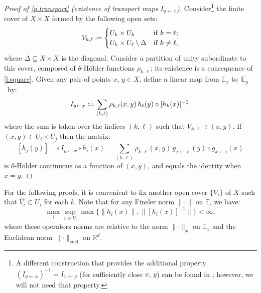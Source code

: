 \documentclass[JEP,XML,SOM,Unicode]{cedram}
\def\vcentcolon{\mathrel{\mathop\ordinarycolon}}
\providecommand\ordinarycolon{:}
\providecommand*\coloneqq{\vcentcolon\mathrel{\mkern-1.2mu}=}
\theoremstyle{plain}
\theoremstyle{definition}
\newcommand{\RR}{\mathbb{R}}
\newcommand{\EE}{\mathbb{E}}
\begin{document}
\skpt
\begin{proof}[Proof of \cref{p.transport} (existence of transport maps $I_{y \gets x}$)]
Consider\footnote{A different construction that provides the additional property $(I_{y \gets x})^{-1} = I_{x \gets y}$ (for sufficiently close $x$, $y$) can be found in \cite[p.\,169]{KalSad}; however, we will not need that property.}
the finite cover of $X \times X$ formed by the following open sets:
\[
V_{k,\ell} \coloneqq
\begin{cases}
	U_k \times U_k &\text{if $k=\ell$;} \\
	U_k \times U_\ell \setminus \Delta &\text{if $k\neq\ell$,}
\end{cases}
\]
where $\Delta \subseteq X \times X$ is the diagonal.
Consider a partition of unity subordinate to this cover, composed of $\theta$-Hölder functions $\rho_{k,\ell}$; its existence is a consequence of \cref{l.square}.
Given any pair of points $x$, $y \in X$, define a linear map from $\EE_x$ to~$\EE_y$~by:
\[
I_{y \gets x} \coloneqq \sum_{(k, \ell)} \rho_{k,\ell}(x,y) \, h_\ell(y) \circ [h_k(x)]^{-1},
\]
where the sum is taken over the indices $(k, \ell)$ such that $V_{k,\ell} \ni (x,y)$.
If $(x,y) \in U_i \times U_j$ then the matrix:
\[
[h_j(y)]^{-1} \circ I_{y \gets x} \circ h_i(x) =
\sum_{(k, \ell)} \rho_{k,\ell}(x,y) \, g_{j \gets \ell}(y) \circ g_{k \gets i}(x)
\]
is $\theta$-Hölder continuous as a function of $(x,y)$,
and equals the identity when $x = y$.
\end{proof}

For the following proofs, it is convenient to fix another open cover $\{V_i\}$ of $X$ such that $\overline{V_i} \subset U_i$ for each $k$.
Note that for any Finsler norm $\| \mathord{\cdot} \|$ on $\EE$, we have:
\begin{equation}\label{e.h_i_bounded}
\max_i \sup_{x \in V_i} \max \big\{ \|h_i(x)\|, \|[h_i(x)]^{-1}\| \big\} < \infty,
\end{equation}
where these operators norms are relative to the norm $\| \mathord{\cdot} \|_x$ on $\EE_x$ and the Euclidean norm $\| \mathord{\cdot} \|_\mathrm{eucl}$ on $\RR^d$.
\end{document}
